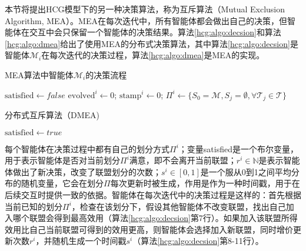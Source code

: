 本节将提出HCG模型下的另一种决策算法，称为互斥算法（Mutual Exclusion Algorithm, MEA）。MEA在每次迭代中，所有智能体都会做出自己的决策，但智能体在交互中会只保留一个智能体的决策结果。算法\ref{hcg:algo:decsion}和算法\ref{hcg:algo:dmea}给出了使用MEA的分布式决策算法，其中算法\ref{hcg:algo:decsion}是智能体$\mathcal{M}_i$在每次迭代的决策过程，算法\ref{hcg:algo:dmea}是MEA的实现。

\begin{algorithm}[htb]
	\caption{MEA算法中智能体$\mathcal{M}_i$的决策流程}
	\label{hcg:algo:decsion}
	\small
	\SetAlgoLined
	$\text{satisfied} \gets false$\;
	$\text{evolved}^i\gets 0$;
	$\text{stamp}^i \gets 0$;
	$\Pi^i \gets \{S_0=\mathcal{M},S_j=\emptyset, \forall \mathcal{T}_j \in \mathcal{T} \}$\;
	
\end{algorithm}

\begin{algorithm}[htb]
	\caption{分布式互斥算法（DMEA)}
	\label{hcg:algo:dmea}
	\small
	\SetAlgoLined
	$\text{satisfied} \gets true$\;
\end{algorithm}

每个智能体在决策过程中都有自己的划分方式$\Pi^i$；变量satisfied是一个布尔变量，用于表示智能体是否对当前划分$\Pi^i$满意，即不会离开当前联盟；$r^i \in \mathbb{N}$是表示智能体做出了新决策，改变了联盟划分的次数；$s^i \in [0,1]$是一个服从0到1之间平均分布的随机变量，它会在划分$\Pi$每次更新时被生成，作用是作为一种时间戳，用于在后续交互时提供一致的依据。智能体在每次迭代中的决策过程是这样的：首先根据当前已知的划分$\Pi^i$，检查在该划分下，假设其他智能体不改变联盟，找出自己加入哪个联盟会得到最高效用（算法\ref{hcg:algo:decsion}第7行）。如果加入该联盟所得效用比自己当前联盟可得到的效用更高，则智能体会选择加入新联盟，同时增价更新次数$r^i$，并随机生成一个时间戳$s^i$（算法\ref{hcg:algo:decsion}第8-11行）。

